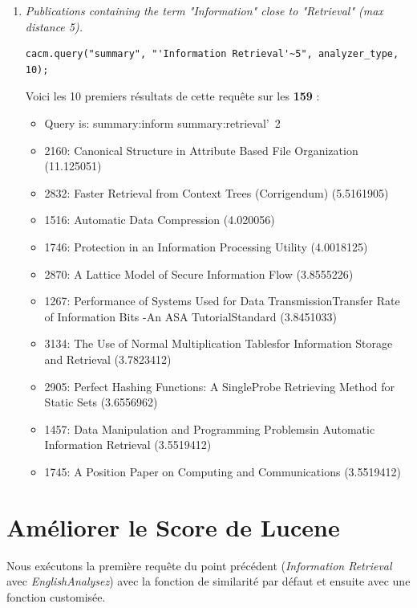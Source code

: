 \begin{enumerate}
\item \textit{Publications containing the term "Information" close to "Retrieval" (max distance 5).}

\begin{lstlisting}
cacm.query("summary", "'Information Retrieval'~5", analyzer_type, 10);
\end{lstlisting}

Voici les 10 premiers résultats de cette requête sur les \textbf{159} :

\begin{itemize}
    \item Query is: summary:inform summary:retrieval'~2
    \item 2160: Canonical Structure in Attribute Based File Organization (11.125051)
    \item 2832: Faster Retrieval from Context Trees (Corrigendum) (5.5161905)
    \item 1516: Automatic Data Compression (4.020056)
    \item 1746: Protection in an Information Processing Utility (4.0018125)
    \item 2870: A Lattice Model of Secure Information Flow (3.8555226)
    \item 1267: Performance of Systems Used for Data TransmissionTransfer Rate of Information Bits -An ASA TutorialStandard (3.8451033)
    \item 3134: The Use of Normal Multiplication Tablesfor Information Storage and Retrieval (3.7823412)
    \item 2905: Perfect Hashing Functions: A SingleProbe Retrieving Method for Static Sets (3.6556962)
    \item 1457: Data Manipulation and Programming Problemsin Automatic Information Retrieval (3.5519412)
    \item 1745: A Position Paper on Computing and Communications (3.5519412)
\end{itemize}

\end{enumerate}

\section{Améliorer le Score de Lucene}

Nous exécutons la première requête du point précédent (\textit{Information Retrieval} avec \textit{EnglishAnalysez}) avec la fonction de similarité par défaut et ensuite avec une fonction customisée.

